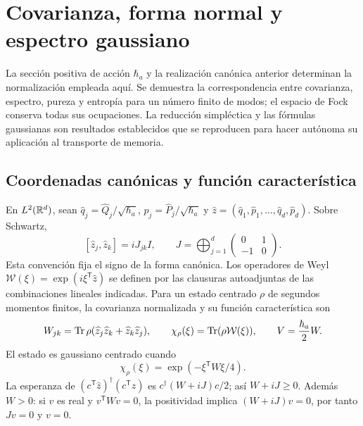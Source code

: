 \section{Covarianza, forma normal y espectro gaussiano}
\label{app:gaussianas-espectro}

La sección positiva de acción \(\hbar_a\) y la realización canónica
anterior determinan la normalización empleada aquí. Se demuestra la
correspondencia entre covarianza, espectro, pureza y entropía para un
número finito de modos; el espacio de Fock conserva todas sus ocupaciones.
La reducción simpléctica y las fórmulas gaussianas son resultados
establecidos que se reproducen para hacer autónoma su aplicación al
transporte de memoria.

\subsection{Coordenadas canónicas y función característica}
En \(L^2(\mathbb R^d)\), sean \(\widehat q_j=\widehat Q_j/\sqrt{\hbar_a}\),
\(\widehat p_j=\widehat P_j/\sqrt{\hbar_a}\) y
\(\widehat z=(\widehat q_1,\widehat p_1,\ldots,\widehat q_d,\widehat p_d)\).
Sobre Schwartz,
\[
 [\widehat z_j,\widehat z_k]=iJ_{jk}I,\qquad
 J=\bigoplus_{j=1}^d\begin{pmatrix}0&1\\-1&0\end{pmatrix}.
\]
Esta convención fija el signo de la forma canónica. Los operadores de
Weyl \(\mathcal W(\xi)=\exp(i\xi^{\mathsf T}\widehat z)\) se definen
por las clausuras autoadjuntas de las combinaciones lineales indicadas.
Para un estado centrado \(\rho\) de segundos momentos finitos, la
covarianza normalizada y su función característica son
\[
 W_{jk}=\operatorname{Tr}\rho(\widehat z_j\widehat z_k+\widehat z_k\widehat z_j),
 \qquad \chi_\rho(\xi)=\operatorname{Tr}(\rho\mathcal W(\xi)),\qquad
 V=\frac{\hbar_a}{2}W.
\]
El estado es gaussiano centrado cuando
\begin{equation}
 \chi_\rho(\xi)=\exp(-\xi^{\mathsf T}W\xi/4).
 \label{app:eq:caracteristica-gaussiana}
\end{equation}
La esperanza de \((c^{\mathsf T}\widehat z)^\dagger
(c^{\mathsf T}\widehat z)\) es \(c^\dagger(W+iJ)c/2\); así
\(W+iJ\geq0\). Además \(W>0\): si \(v\) es real y
\(v^{\mathsf T}Wv=0\), la positividad implica \((W+iJ)v=0\),
por tanto \(Jv=0\) y \(v=0\).

